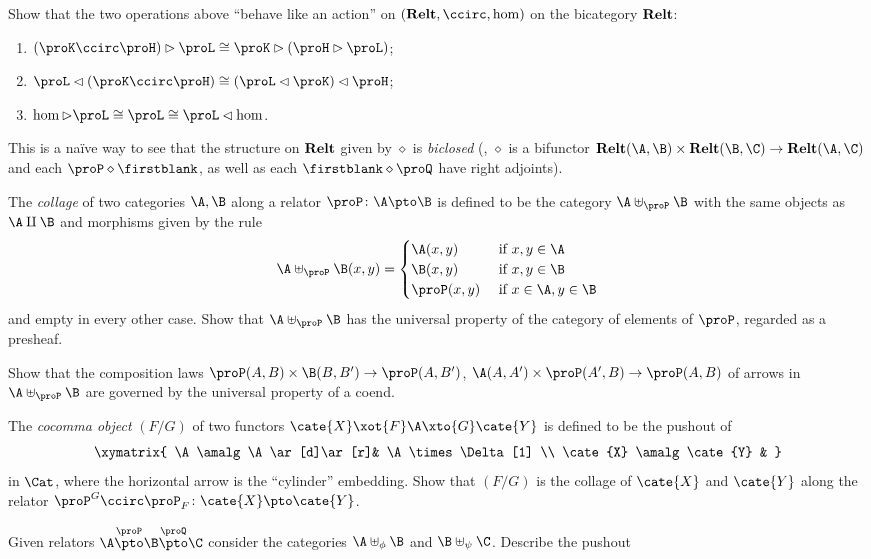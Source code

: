 \begin{exerciseset}
\begin{exercisepoints}
\item Show that the two operations above ``behave like an action'' on $(\Dist,\ccirc,\hom)$ on the bicategory $\textbf{Relt}$:
\begin{enumerate}[label=\textbf{\roman*})]
\item $(\proK\ccirc \proH)\rhd \proL\cong \proK\rhd(\proH\rhd \proL)$;
\item $\proL \lhd(\proK \ccirc \proH)\cong (\proL\lhd \proK)\lhd \proH$;
\item $\hom\rhd \proL\cong \proL\cong \proL\lhd \hom$.
\end{enumerate}
This is a na\"ive way to see that the structure on $\textbf{Relt}$ given by $\diamond$ is \emph{biclosed} (\ie, $\diamond$ is a bifunctor $\Dist(\A,\B)\times \Dist(\B,\C) \to \Dist(\A,\C)$ and each $\proP\diamond\firstblank$, as well as each $\firstblank\diamond \proQ$ have right adjoints).
\item \label{collage} The \emph{collage} of two categories $\A,\B$ along a relator $\proP\colon \A \pto \B$ is defined to be the category $\A \uplus_\proP \B$ with the same objects as $\A \amalg \B$ and morphisms given by the rule
\[
\A\uplus_\proP \B(x,y) =
\begin{cases}
\A(x,y) & \text{ if } x,y\in\A\\
\B(x,y) & \text{ if } x,y\in \B\\
\proP(x,y) & \text{ if } x\in \A, y\in\B
\end{cases}
\]
and empty in every other case. Show that $\A\uplus_\proP \B$ has the universal property of the category of elements of $\proP$, regarded as a presheaf.
\item Show that the composition laws $\proP(A,B)\times \B(B,B')\to \proP(A,B')$, $\A(A,A')\times \proP(A',B)\to \proP(A, B)$ of arrows in $\A\uplus_\proP \B$ are governed by the universal property of a coend.
\item The \emph{cocomma object} $(F/G)$ of two functors $\cate{X} \xot{F} \A \xto{G} \cate{Y}$ is defined to be the pushout of
\[
\xymatrix{
	\A \amalg \A \ar[d]\ar[r]& \A \times \Delta[1] \\
	\cate{X} \amalg \cate{Y} & 
}
\]
in $\Cat$, where the horizontal arrow is the ``cylinder'' embedding. Show that $(F/G)$ is the collage of $\cate{X}$ and $\cate{Y}$ along the relator $\proP^G \ccirc \proP_F \colon \cate{X} \pto \cate{Y}$.
\item Given relators $\A \overset{\proP}\pto \B \overset{\proQ}\pto \C$ consider the categories $\A\uplus_\phi\B$ and $\B\uplus_\psi\C$. Describe the pushout

\end{exercisepoints}
\end{exerciseset}
